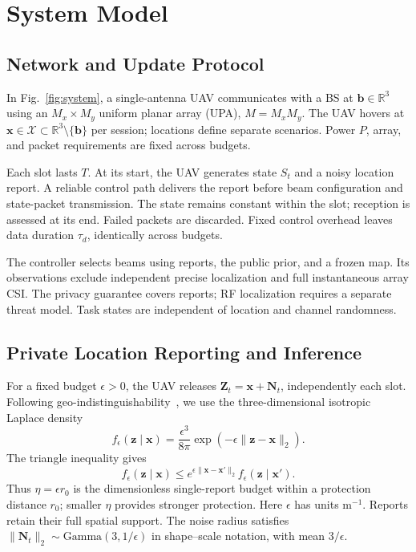 \section{System Model}
\label{sec:system}
\subsection{Network and Update Protocol}
In Fig.~\ref{fig:system}, a single-antenna UAV communicates with a BS at $\mathbf b\in\mathbb R^3$ using an $M_x\times M_y$ uniform planar array (UPA), $M=M_xM_y$. The UAV hovers at $\mathbf x\in\mathcal X\subset\mathbb R^3\setminus\{\mathbf b\}$ per session; locations define separate scenarios. Power $P$, array, and packet requirements are fixed across budgets.

Each slot lasts $T$. At its start, the UAV generates state $S_t$ and a noisy location report. A reliable control path delivers the report before beam configuration and state-packet transmission. The state remains constant within the slot; reception is assessed at its end. Failed packets are discarded. Fixed control overhead leaves data duration $\tau_d$, identically across budgets.

The controller selects beams using reports, the public prior, and a frozen map. Its observations exclude independent precise localization and full instantaneous array CSI. The privacy guarantee covers reports; RF localization requires a separate threat model. Task states are independent of location and channel randomness.


\subsection{Private Location Reporting and Inference}
For a fixed budget $\epsilon>0$, the UAV releases $\mathbf Z_t=\mathbf x+\mathbf N_t$, independently each slot. Following geo-indistinguishability~\cite{andres2013geo,min2022three}, we use the three-dimensional isotropic Laplace density
\begin{equation}
 f_\epsilon(\mathbf z\mid\mathbf x)
 =\frac{\epsilon^3}{8\pi}\exp(-\epsilon\|\mathbf z-\mathbf x\|_2).
 \label{eq:laplace}
\end{equation}
The triangle inequality gives
\begin{equation}
 f_\epsilon(\mathbf z\mid\mathbf x)
 \le e^{\epsilon\|\mathbf x-\mathbf x'\|_2}
 f_\epsilon(\mathbf z\mid\mathbf x').
 \label{eq:gi}
\end{equation}
Thus $\eta=\epsilon r_0$ is the dimensionless single-report budget within a protection distance $r_0$; smaller $\eta$ provides stronger protection. Here $\epsilon$ has units $\mathrm m^{-1}$. Reports retain their full spatial support. The noise radius satisfies $\|\mathbf N_t\|_2\sim\mathrm{Gamma}(3,1/\epsilon)$ in shape--scale notation, with mean $3/\epsilon$. 

